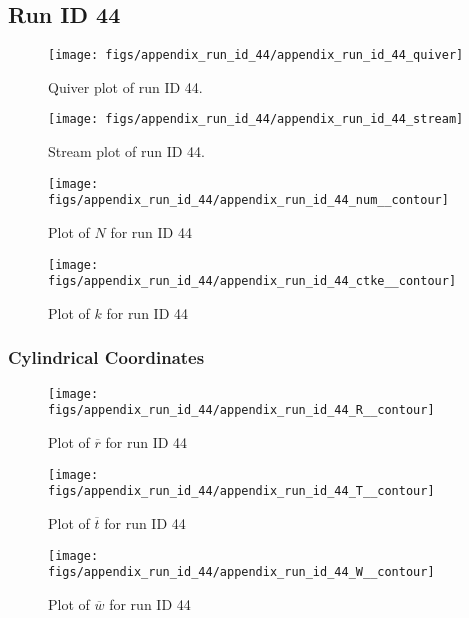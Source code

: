 \subsection{Run ID 44}
\begin{figure}[H]
\centering
\texttt{[image: figs/appendix\_run\_id\_44/appendix\_run\_id\_44\_quiver]}
\caption{Quiver plot of run ID 44.}
\label{fig:appendix_run_id_44_quiver}
\end{figure}


\begin{figure}[H]
\centering
\texttt{[image: figs/appendix\_run\_id\_44/appendix\_run\_id\_44\_stream]}
\caption{Stream plot of run ID 44.}
\label{fig:appendix_run_id_44_stream}
\end{figure}


\begin{figure}[H]
\centering
\texttt{[image: figs/appendix\_run\_id\_44/appendix\_run\_id\_44\_num\_\_contour]}
\caption{Plot of $N$ for run ID 44}
\label{fig:appendix_run_id_44_num__contour}
\end{figure}


\begin{figure}[H]
\centering
\texttt{[image: figs/appendix\_run\_id\_44/appendix\_run\_id\_44\_ctke\_\_contour]}
\caption{Plot of $k$ for run ID 44}
\label{fig:appendix_run_id_44_ctke__contour}
\end{figure}


\subsubsection{Cylindrical Coordinates}
\begin{figure}[H]
\centering
\texttt{[image: figs/appendix\_run\_id\_44/appendix\_run\_id\_44\_R\_\_contour]}
\caption{Plot of $\overline{r}$ for run ID 44}
\label{fig:appendix_run_id_44_R__contour}
\end{figure}


\begin{figure}[H]
\centering
\texttt{[image: figs/appendix\_run\_id\_44/appendix\_run\_id\_44\_T\_\_contour]}
\caption{Plot of $\overline{t}$ for run ID 44}
\label{fig:appendix_run_id_44_T__contour}
\end{figure}


\begin{figure}[H]
\centering
\texttt{[image: figs/appendix\_run\_id\_44/appendix\_run\_id\_44\_W\_\_contour]}
\caption{Plot of $\overline{w}$ for run ID 44}
\label{fig:appendix_run_id_44_W__contour}
\end{figure}


